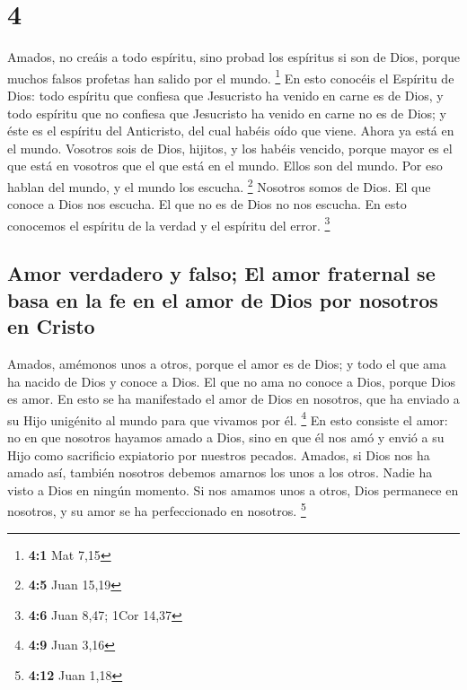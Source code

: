 \hypertarget{section-3}{%
\section{4}\label{section-3}}

 Amados, no creáis a todo espíritu, sino probad los
espíritus si son de Dios, porque muchos falsos profetas han salido por
el mundo. \footnote{\textbf{4:1} Mat 7,15}  En esto
conocéis el Espíritu de Dios: todo espíritu que confiesa que Jesucristo
ha venido en carne es de Dios,  y todo espíritu que no
confiesa que Jesucristo ha venido en carne no es de Dios; y éste es el
espíritu del Anticristo, del cual habéis oído que viene. Ahora ya está
en el mundo.  Vosotros sois de Dios, hijitos, y los habéis
vencido, porque mayor es el que está en vosotros que el que está en el
mundo.  Ellos son del mundo. Por eso hablan del mundo, y
el mundo los escucha. \footnote{\textbf{4:5} Juan 15,19} 
Nosotros somos de Dios. El que conoce a Dios nos escucha. El que no es
de Dios no nos escucha. En esto conocemos el espíritu de la verdad y el
espíritu del error. \footnote{\textbf{4:6} Juan 8,47; 1Cor 14,37}

\hypertarget{amor-verdadero-y-falso-el-amor-fraternal-se-basa-en-la-fe-en-el-amor-de-dios-por-nosotros-en-cristo}{%
\subsection{Amor verdadero y falso; El amor fraternal se basa en la fe
en el amor de Dios por nosotros en
Cristo}\label{amor-verdadero-y-falso-el-amor-fraternal-se-basa-en-la-fe-en-el-amor-de-dios-por-nosotros-en-cristo}}

 Amados, amémonos unos a otros, porque el amor es de Dios;
y todo el que ama ha nacido de Dios y conoce a Dios.  El
que no ama no conoce a Dios, porque Dios es amor.  En esto
se ha manifestado el amor de Dios en nosotros, que ha enviado a su Hijo
unigénito al mundo para que vivamos por él. \footnote{\textbf{4:9} Juan
  3,16}  En esto consiste el amor: no en que nosotros
hayamos amado a Dios, sino en que él nos amó y envió a su Hijo como
sacrificio expiatorio por nuestros pecados.  Amados, si
Dios nos ha amado así, también nosotros debemos amarnos los unos a los
otros.  Nadie ha visto a Dios en ningún momento. Si nos
amamos unos a otros, Dios permanece en nosotros, y su amor se ha
perfeccionado en nosotros. \footnote{\textbf{4:12} Juan 1,18}

